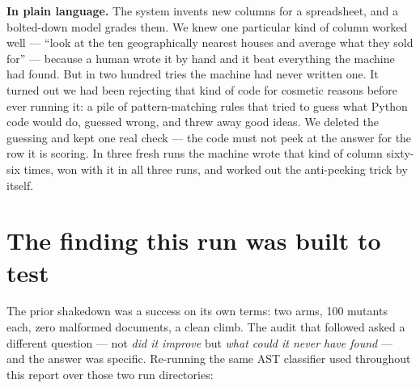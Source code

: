 \documentclass[11pt]{article}
\newenvironment{eli5}
  {\par\medskip\noindent\begin{lrbox}{\eliBox}\begin{minipage}{\dimexpr\linewidth-2\fboxsep-2\fboxrule}\small}
  {\end{minipage}\end{lrbox}\noindent\fcolorbox{accent!40}{accent!4}{\usebox{\eliBox}}\par\medskip}
\begin{document}
\begin{abstract}
\smallskip\noindent
A follow-up run on current \texttt{main} exercises Memory V2 end to end with Gemini
3.5 Flash as mutator and Qwen Instruct as the memory model. Its champion reaches
\memBestCV{}~CV $R^2$ and \memBestTestRmse{} held-out RMSE; the best child that explicitly
cites a card reaches RMSE \memExplicitBestRmse{}. The historical no-memory trajectories are
shown as a reference envelope, not a causal ablation: the seed graph and evaluator revision
changed. The randomized ledger itself does not show a global delivery advantage
(\memAllDeliveredGain{} mean gain when delivered versus \memAllControlGain{} when
withheld), but it does show useful card-driven kNN mutations on weaker parents, stable
dynamic-MAP context, and nonzero evaluator uncertainty on every valid terminal.
\end{abstract}

\begin{eli5}
\textbf{In plain language.} The system invents new columns for a spreadsheet, and a
bolted-down model grades them. We knew one particular kind of column worked well --- ``look
at the ten geographically nearest houses and average what they sold for'' --- because a
human wrote it by hand and it beat everything the machine had found. But in two hundred
tries the machine had never written one. It turned out we had been rejecting that kind of
code for cosmetic reasons before ever running it: a pile of pattern-matching rules that
tried to guess what Python code would do, guessed wrong, and threw away good ideas. We
deleted the guessing and kept one real check --- the code must not peek at the answer for
the row it is scoring. In three fresh runs the machine wrote that kind of column sixty-six
times, won with it in all three runs, and worked out the anti-peeking trick by itself.
\end{eli5}

\section{The finding this run was built to test}

The prior shakedown was a success on its own terms: two arms, 100 mutants each, zero
malformed documents, a clean climb. The audit that followed asked a different question ---
not \emph{did it improve} but \emph{what could it never have found} --- and the answer was
specific. Re-running the same AST classifier used throughout this report over those two
run directories:
\end{document}
